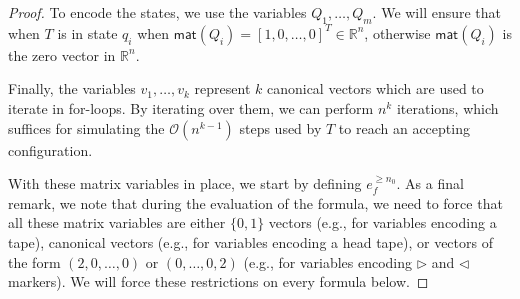 \begin{proof}
    To encode the states, we use the variables $Q_1,\ldots,Q_m$. We will ensure that when $T$ is in state 
    $q_i$ when
    $\mathsf{mat}(Q_i)=[1,0,\ldots,0]^T\in\mathbb{R}^n$, otherwise $\mathsf{mat}(Q_i)$ is the zero 
    vector in $\mathbb{R}^n$.	

    Finally, the variables $v_1,\ldots,v_{k}$ represent $k$ canonical vectors  which are used to iterate 
    in for-loops. By iterating over them, we can perform $n^{k}$ iterations, 
    which suffices for simulating the $\mathcal{O}(n^{k-1})$ steps used by $T$ to reach an accepting configuration.
    
    With these matrix variables in place, we start by defining $e_f^{\geq n_0}$. As a final remark, we note that during the evaluation of the formula, we need to force that all these matrix variables are either $\{0,1\}$ vectors (e.g., for variables encoding a tape), canonical vectors (e.g., for variables encoding a head tape), or vectors of the form $(2,0,\ldots,0)$ or $(0, \ldots, 0, 2)$ (e.g., for variables encoding $\rhd$ and $\lhd$ markers).
    We will force these restrictions on every formula below. 


\end{proof}
